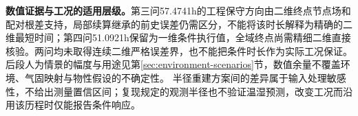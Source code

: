 \textbf{数值证据与工况的适用层级。}第三问57.4741\unit{h}的工程保守方向由二维终点节点场和配对根差支持，局部续算继承的前史误差仍需区分，不能将该时长解释为精确的二维最短时间；第四问51.0921\unit{h}保留为一维条件执行值，全域终点尚需精细二维直接核验。两问均未取得连续二维严格误差界，也不能把条件时长作为实际工况保证。后段人为情景的幅度与用途见第\ref{sec:environment-scenarios}节，数值余量不覆盖环境、气固映射与物性假设的不确定性。
半径重建方案间的差异属于输入处理敏感性，不给出测量置信区间；复现规定的观测半径也不验证温湿预测，改变工况而沿用该历程时仅能报告条件响应。
\par\endgroup

